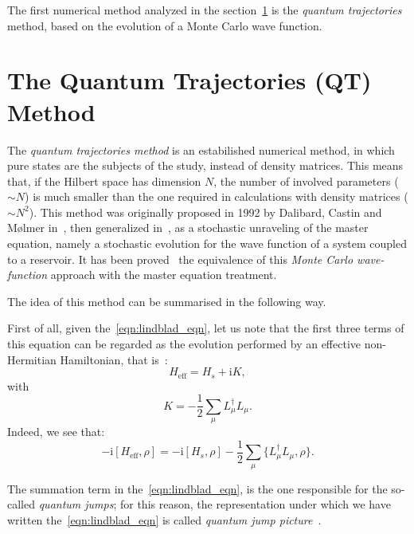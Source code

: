 The first numerical method analyzed in the section~\ref{chapt2_qtm} is the \emph{quantum trajectories} method, based on the evolution of a Monte Carlo wave function.

\section{The Quantum Trajectories (QT) Method}
\label{chapt2_qtm}
The \emph{quantum trajectories method} is an estabilished numerical method, in which pure states are the subjects of the study, instead of density matrices. This means that, if the Hilbert space has dimension $N$, the number of involved parameters ($\sim N$) is much smaller than the one required in calculations with density matrices ($\sim N^2$). This method was originally proposed in 1992 by Dalibard, Castin and Mølmer in~\cite{PhysRevLett.68.580}, then generalized in~\cite{Molmer:93}, as a stochastic unraveling of the master equation, namely a stochastic evolution for the wave function of a system coupled to a reservoir. It has been proved~\cite{PhysRevLett.68.580, Molmer:93} the equivalence of this \emph{Monte Carlo wave-function} approach with the master equation treatment.

The idea of this method can be summarised in the following way.

First of all, given the~\ref{eqn:lindblad_eqn}, let us note that the first three terms of this equation can be regarded as the evolution performed by an effective non-Hermitian Hamiltonian, that is~\cite{PhysRevA.69.062317}:
\begin{equation*}
    H_{\text{eff}} = H_s + \text{i}K,
\end{equation*}
with
\begin{equation*}
    K = -\frac{1}{2}\sum_\mu L_{\mu}^{\dagger}L_{\mu}.
\end{equation*}
Indeed, we see that:
\begin{equation*}
    -\text{i}[H_\text{eff}, \rho] = -\text{i}[H_s, \rho] - \frac{1}{2}\sum_\mu \{L_{\mu}^{\dagger}L_{\mu}, \rho\}.
\end{equation*}

The summation term in the~\ref{eqn:lindblad_eqn}, is the one responsible for the so-called \emph{quantum jumps}; for this reason, the representation under which we have written the~\ref{eqn:lindblad_eqn} is called \emph{quantum jump picture}~\cite{PhysRevA.69.062317}. 

